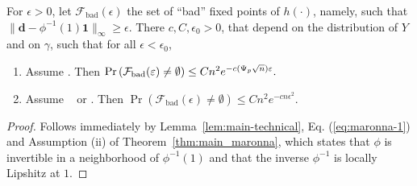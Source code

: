 \documentclass[times,sort&compress,3p]{elsarticle}
\begin{document}
\begin{lemma}
        \label{lem:maronna-conc}
For $\epsilon>0$, let
$\mathcal{F}_{\mathrm{bad}}(\epsilon)$ the set of ``bad'' fixed points of $h(\cdot)$, namely, such that  
${\|\bm{d}-\phi^{-1}(1)\bm{1}\|_{\infty}\ge \epsilon}$. 
There $c,C,\epsilon_0>0$,  that depend on the distribution of $Y$ and on $\gamma$, such that for all  $\epsilon<\epsilon_0$,
        \begin{enumerate}
                \item Assume \AssumLC. Then
                $
                \Pr\left(\mathcal{F}_{\mathrm{bad}}(\varepsilon)\ne \emptyset\right) \le Cn^2e^{-c(\Psi_p\sqrt{n})\varepsilon}.
                $
                \item Assume \AssumIndep~ or \AssumCCPSB. Then
                $
                \Pr\left(\mathcal{F}_{\mathrm{bad}}(\epsilon)\ne \emptyset \right) \le Cn^2e^{-cn\epsilon^2}.
                $
        \end{enumerate}
\end{lemma}
\begin{proof}
Follows immediately by Lemma~\ref{lem:main-technical}, Eq. (\ref{eq:maronna-1}) and Assumption (ii) of Theorem~\ref{thm:main_maronna}, which states that $\phi$ is invertible in a neighborhood of $\phi^{-1}(1)$ and that the inverse $\phi^{-1}$ is locally Lipshitz at $1$.
\end{proof}
\end{document}
